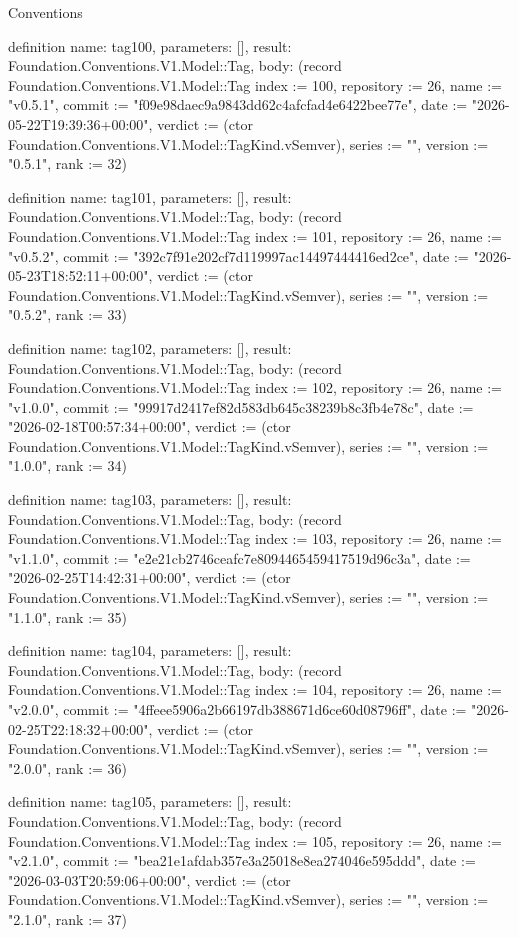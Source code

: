 \begin{lexlean}{Conventions}
\begin{semanticmodule}
definition{
  name: tag100,
  parameters: [],
  result: Foundation.Conventions.V1.Model::Tag,
  body: (record Foundation.Conventions.V1.Model::Tag {index := 100, repository := 26, name := "v0.5.1", commit := "f09e98daec9a9843dd62c4afcfad4e6422bee77e", date := "2026-05-22T19:39:36+00:00", verdict := (ctor Foundation.Conventions.V1.Model::TagKind.vSemver), series := "", version := "0.5.1", rank := 32})
}

definition{
  name: tag101,
  parameters: [],
  result: Foundation.Conventions.V1.Model::Tag,
  body: (record Foundation.Conventions.V1.Model::Tag {index := 101, repository := 26, name := "v0.5.2", commit := "392c7f91e202cf7d119997ac14497444416ed2ce", date := "2026-05-23T18:52:11+00:00", verdict := (ctor Foundation.Conventions.V1.Model::TagKind.vSemver), series := "", version := "0.5.2", rank := 33})
}

definition{
  name: tag102,
  parameters: [],
  result: Foundation.Conventions.V1.Model::Tag,
  body: (record Foundation.Conventions.V1.Model::Tag {index := 102, repository := 26, name := "v1.0.0", commit := "99917d2417ef82d583db645c38239b8c3fb4e78c", date := "2026-02-18T00:57:34+00:00", verdict := (ctor Foundation.Conventions.V1.Model::TagKind.vSemver), series := "", version := "1.0.0", rank := 34})
}

definition{
  name: tag103,
  parameters: [],
  result: Foundation.Conventions.V1.Model::Tag,
  body: (record Foundation.Conventions.V1.Model::Tag {index := 103, repository := 26, name := "v1.1.0", commit := "e2e21cb2746ceafc7e8094465459417519d96c3a", date := "2026-02-25T14:42:31+00:00", verdict := (ctor Foundation.Conventions.V1.Model::TagKind.vSemver), series := "", version := "1.1.0", rank := 35})
}

definition{
  name: tag104,
  parameters: [],
  result: Foundation.Conventions.V1.Model::Tag,
  body: (record Foundation.Conventions.V1.Model::Tag {index := 104, repository := 26, name := "v2.0.0", commit := "4ffeee5906a2b66197db388671d6ce60d08796ff", date := "2026-02-25T22:18:32+00:00", verdict := (ctor Foundation.Conventions.V1.Model::TagKind.vSemver), series := "", version := "2.0.0", rank := 36})
}

definition{
  name: tag105,
  parameters: [],
  result: Foundation.Conventions.V1.Model::Tag,
  body: (record Foundation.Conventions.V1.Model::Tag {index := 105, repository := 26, name := "v2.1.0", commit := "bea21e1afdab357e3a25018e8ea274046e595ddd", date := "2026-03-03T20:59:06+00:00", verdict := (ctor Foundation.Conventions.V1.Model::TagKind.vSemver), series := "", version := "2.1.0", rank := 37})
}


\end{semanticmodule}
\end{lexlean}
